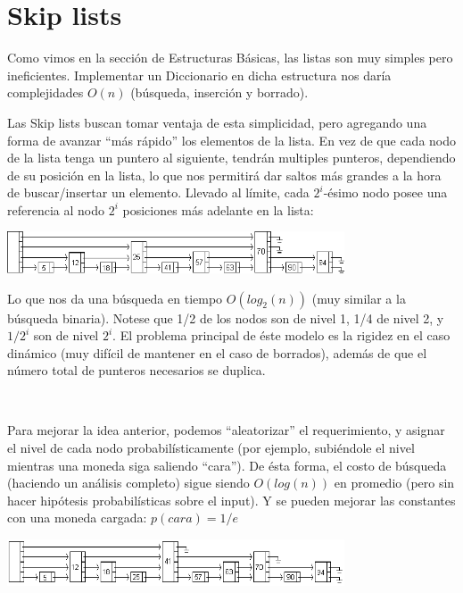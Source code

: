 \newpage
\section{Skip lists}

Como vimos en la secci\'on de Estructuras B\'asicas, las listas son muy simples pero ineficientes. Implementar un Diccionario en dicha estructura nos dar\'ia complejidades $O(n)$ (b\'usqueda, inserci\'on y borrado).

Las Skip lists buscan tomar ventaja de esta simplicidad, pero agregando una forma de avanzar ``m\'as r\'apido'' los elementos de la lista.
En vez de que cada nodo de la lista tenga un puntero al siguiente, tendr\'an multiples punteros, dependiendo de su posici\'on en la lista, lo que nos permitir\'a dar saltos m\'as grandes a la hora de buscar/insertar un elemento.
Llevado al l\'imite, cada $2^i$-\'esimo nodo posee una referencia al nodo $2^i$ posiciones m\'as adelante en la lista:

\begin{center}
 \includegraphics[width=0.75\textwidth, height=0.09\textwidth]{./graficos/skip-list-fixed.png}
\end{center}

Lo que nos da una b\'usqueda en tiempo $O(log_2(n))$ (muy similar a la b\'usqueda binaria). Notese que 1/2 de los nodos son de nivel 1, 1/4 de nivel 2, y $1/2^i$ son de nivel $2^i$.
El problema principal de \'este modelo es la rigidez en el caso din\'amico (muy dif\'icil de mantener en el caso de borrados), adem\'as de que el n\'umero total de punteros necesarios se duplica.

~

Para mejorar la idea anterior, podemos ``aleatorizar'' el requerimiento, y asignar el nivel de cada nodo probabil\'isticamente (por ejemplo, subi\'endole el nivel mientras una moneda siga saliendo ``cara'').
De \'esta forma, el costo de b\'usqueda (haciendo un an\'alisis completo) sigue siendo $O(log(n))$ en promedio (pero sin hacer hip\'otesis probabil\'isticas sobre el input). Y se pueden mejorar las constantes con una moneda cargada: $p(cara)= 1/e$

\begin{center}
 \includegraphics[width=0.75\textwidth, height=0.09\textwidth]{./graficos/skip-list-relaxed.png}
\end{center}

